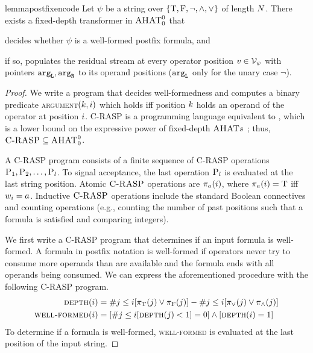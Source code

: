 \documentclass{article}
\begin{document}
\begin{restatable}{lemma}{postfixencode}\label{lem:postfixencode}
    Let $\psi$ be a string over ${{\{ {\mathbin{\mathrm{T}}}, {\mathbin{\mathrm{F}}}, \neg, \land, \lor \}}}$ of length ${{ N}}$. There exists a fixed-depth transformer in ${{\textsc{AHAT}}}^0_0$ that
    \begin{enumerate*}[label=\textit{(\roman*)}]
        \item decides whether $\psi$ is a well-formed postfix formula, and
        \item if so, populates the residual stream at every operator position $v \in {\mathcal{V}}_\psi$ with pointers ${\mathtt{arg}_\mathtt{L}}, {\mathtt{arg}_\mathtt{R}}$ to its operand positions (${\mathtt{arg}_\mathtt{L}}$ only for the unary case $\neg$).
    \end{enumerate*}
\end{restatable}
\begin{proof}\label{app:proofpostfixencode}
    We write a  program \citep{yang2024countingliketransformerscompiling} that decides well-formedness and computes a binary predicate \textsc{argument}$({{ k}}, {{ i}})$ which holds iff position ${{ k}}$ holds an operand of the operator at position ${{ i}}$.
    \textsc{C-RASP} is a programming language equivalent to  \citep{yang2024countingliketransformerscompiling}, which is a lower bound on the expressive power of fixed-depth ${{{\textsc{AHAT}}}}s$ \citep{barcelo2024logical}; thus, $\textsc{C-RASP} \subseteq {{\textsc{AHAT}}}^{0}_{0}$.
    
    A \textsc{C-RASP} program consists of a finite sequence of \textsc{C-RASP} operations ${\textsc{P}}_1, {\textsc{P}}_2, \ldots, {\textsc{P}}_l$.
    To signal acceptance, the last operation ${\textsc{P}}_l$ is evaluated at the last string position.
    Atomic $\textsc{C-RASP}$ operations are ${\pi}_{{a}}({{ i}})$, where ${\pi}_{{a}}({{ i}}) = {\mathbin{\mathrm{T}}}$ iff ${w}_{{ i}} = {{a}}$.
    Inductive $\textsc{C-RASP}$ operations include the standard Boolean connectives and counting operations (e.g., counting the number of past positions such that a formula is satisfied and comparing integers).
    
    We first write a \textsc{C-RASP} program that determines if an input formula is well-formed.
    A formula in postfix notation is well-formed if operators never try to consume more operands than are available and the formula ends with all operands being consumed.
    We can express the aforementioned procedure with the following \textsc{C-RASP} program.
    \begin{subequations}
        \begin{align}
            \text{\textsc{depth}}({{ i}}) & = \# {{ j}} \leq {{ i}} [{\pi}_{{\mathbin{\mathrm{T}}}}({{ j}}) \lor {\pi}_{{\mathbin{\mathrm{F}}}}({{ j}})] - \# {{ j}} \leq {{ i}} [{\pi}_{\lor}({{ j}}) \lor {\pi}_{\land}({{ j}})] \\
            \text{\textsc{well-formed}}({{ i}}) & = [\# {{ j}} \leq {{ i}} [\text{\textsc{depth}}({{ j}}) < 1] = 0] \land [\text{\textsc{depth}}({{ i}}) = 1]
        \end{align}
    \end{subequations}
    To determine if a formula is well-formed, \textsc{well-formed} is evaluated at the last position of the input string.
    

\end{proof}
\end{document}
